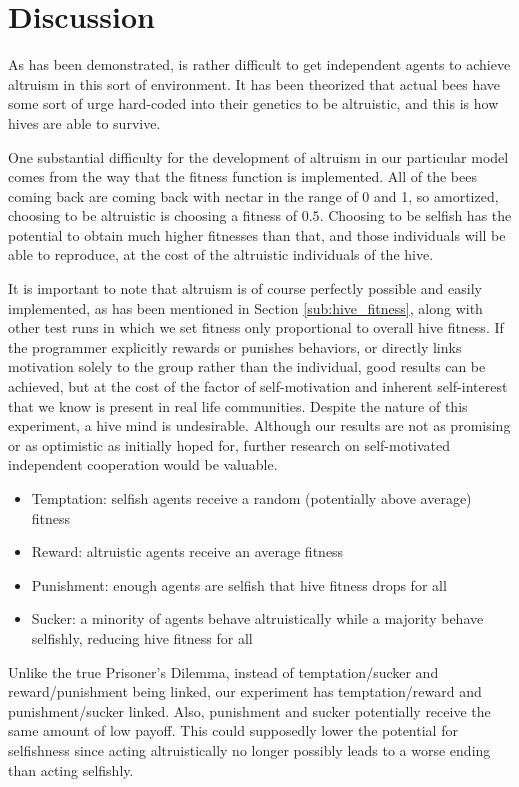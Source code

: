 \documentclass[11pt]{article}
\begin{document}


	\section{Discussion} %
	\label{sec:discussion}

		As has been demonstrated, is rather difficult to get independent agents to achieve altruism in this sort of environment. It has been theorized that actual bees have some sort of urge hard-coded into their genetics to be altruistic, and this is how hives are able to survive. \cite{macy}

		One substantial difficulty for the development of altruism in our particular model comes from the way that the fitness function is implemented. All of the bees coming back are coming back with nectar in the range of 0 and 1, so amortized, choosing to be altruistic is choosing a fitness of $0.5$. Choosing to be selfish has the potential to obtain much higher fitnesses than that, and those individuals will be able to reproduce, at the cost of the altruistic individuals of the hive.

		It is important to note that altruism is of course perfectly possible and easily implemented, as has been mentioned in Section \ref{sub:hive_fitness}, along with other test runs in which we set fitness only proportional to overall hive fitness. If the programmer explicitly rewards or punishes behaviors, or directly links motivation solely to the group rather than the individual, good results can be achieved, but at the cost of the factor of self-motivation and inherent self-interest that we know is present in real life communities. Despite the nature of this experiment, a hive mind is undesirable. Although our results are not as promising or as optimistic as initially hoped for, further research on self-motivated independent cooperation would be valuable. 

		\begin{itemize}
		\item Temptation: selfish agents receive a random (potentially above average) fitness
		\item Reward: altruistic agents receive an average fitness
		\item Punishment: enough agents are selfish that hive fitness drops for all
		\item Sucker: a minority of agents behave altruistically while a majority behave selfishly, reducing hive fitness for all
		\end{itemize}
		Unlike the true Prisoner's Dilemma, instead of temptation/sucker and reward/punishment being linked, our experiment has temptation/reward and punishment/sucker linked. Also, punishment and sucker potentially receive the same amount of low payoff. This could supposedly lower the potential for selfishness since acting altruistically no longer possibly leads to a worse ending than acting selfishly.



	\nocite{*}
	
	
\end{document}
